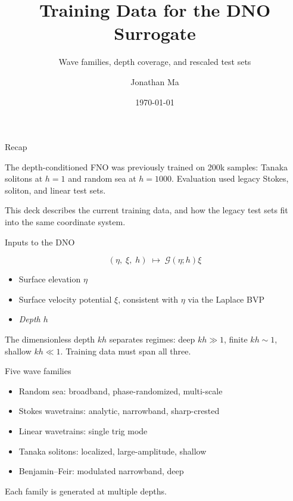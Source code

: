 \documentclass[aspectratio=169,11pt]{beamer}
\title{Training Data for the DNO Surrogate}
\subtitle{Wave families, depth coverage, and rescaled test sets}
\date{\today}
\author{Jonathan Ma}
\newcommand{\Gop}{\mathcal{G}}
\begin{document}
\begin{frame}\titlepage\end{frame}

\begin{frame}{Recap}

The depth-conditioned FNO was previously trained on 200k samples:
Tanaka solitons at $h=1$ and random sea at $h=1000$. Evaluation used
legacy Stokes, soliton, and linear test sets.

\pause
This deck describes the current training data, and how the legacy
test sets fit into the same coordinate system.
\end{frame}

\begin{frame}{Inputs to the DNO}

\[
  (\eta,\; \xi,\; h) \;\longmapsto\; \Gop(\eta;h)\xi
\]

\begin{itemize}
  \item Surface elevation $\eta$
  \item Surface velocity potential $\xi$, consistent with $\eta$ via the Laplace BVP
  \item \emph{Depth $h$}
\end{itemize}

\pause
The dimensionless depth $kh$ separates regimes: deep $kh \gg 1$,
finite $kh \sim 1$, shallow $kh \ll 1$. Training data must span all three.
\end{frame}

\begin{frame}{Five wave families}

\begin{itemize}
  \item Random sea: broadband, phase-randomized, multi-scale
  \item Stokes wavetrains: analytic, narrowband, sharp-crested
  \item Linear wavetrains: single trig mode
  \item Tanaka solitons: localized, large-amplitude, shallow
  \item Benjamin--Feir: modulated narrowband, deep
\end{itemize}

\pause
Each family is generated at multiple depths.
\end{frame}
\end{document}
